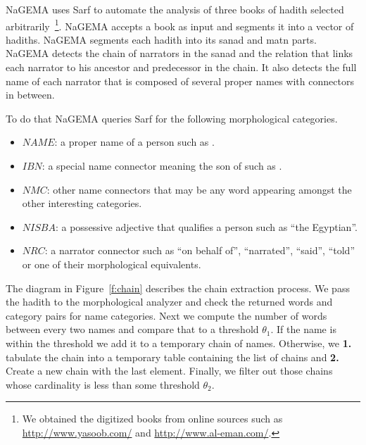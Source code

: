 \documentclass{llncs}
\begin{document}
NaGEMA uses Sarf to automate the
analysis of three books of hadith selected 
arbitrarily~\cite{IbnHanbal,AlKulayni,AlTousi}\footnote{We obtained
  the digitized books from online sources such as 
  \href{http://www.yasoob.com/}{http://www.yasoob.com/} and 
  \href{http://www.al-eman.com/}{http://www.al-eman.com/}. }.
NaGEMA accepts a book as input
and segments it into a vector of hadiths. 
NaGEMA segments each hadith into its
sanad and matn parts. 
NaGEMA 
detects the chain of narrators in the sanad and 
the relation that links each narrator to his ancestor and 
predecessor in the chain. 
It also detects the full name of each narrator that is
composed of several proper names with connectors
in between. 

To do that NaGEMA queries Sarf for the following morphological 
categories.
\begin{itemize}
\item $\mathit{NAME}$: a proper name of a person such as  .
\item $\mathit{IBN}$: a special name connector meaning the son of such as .
\item $\mathit{NMC}$: other name connectors that may be any word appearing amongst the other interesting categories. 
\item $\mathit{NISBA}$: a possessive adjective that qualifies a person such 
as  ``the Egyptian''. 
\item $\mathit{NRC}$: a narrator connector such as
 ``on behalf of'',  ``narrated'',  ``said'', 
 ``told'' or one of their morphological equivalents. 
\end{itemize}


The diagram in Figure~\ref{f:chain} describes 
the chain extraction process. 
We pass the hadith to the morphological analyzer 
and check the returned words and category pairs 
for name categories.
Next we compute the number of words between every two names
and compare that to a threshold $\theta_1$.
If the name is within the threshold we add it to a temporary 
chain of names. 
Otherwise, we 
{\bf 1.} tabulate the chain into a temporary table containing 
the list of chains and
{\bf 2.} Create a new chain with the last element.
Finally, we filter out those chains whose cardinality 
is less than some threshold  $\theta_2$.
\end{document}
